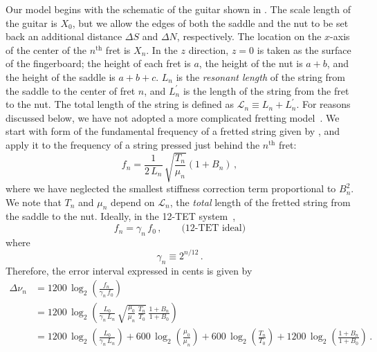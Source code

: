 Our model begins with the schematic of the guitar shown in . The scale length of the guitar is $X_0$, but we allow the edges of both the saddle and the nut to be set back an additional distance $\Delta S$ and $\Delta N$, respectively. The location on the $x$-axis of the center of the $n^\textrm{th}$ fret is $X_n$. In the $z$ direction, $z = 0$ is taken as the surface of the fingerboard; the height of each fret is $a$, the height of the nut is $a + b$, and the height of the saddle is $a + b + c$. $L_n$ is the \emph{resonant length} of the string from the saddle to the center of fret $n$, and $L^\prime_n$ is the length of the string from the fret to the nut. The total length of the string is defined as $\mathcal{L}_n \equiv L_n + L^\prime_n$. For reasons discussed below, we have not adopted a more complicated fretting model~\cite{ref:byers1996cgi,ref:varieschi2010icf}. We start with form of the fundamental frequency of a fretted string given by , and apply it to the frequency of a string pressed just behind the $n^\mathrm{th}$ fret:
 \begin{equation} \label{eqn:f_n_def}
f_n = \frac{1}{2\, L_n}\, \sqrt{\frac{T_n}{\mu_n}} \left( 1 + B_n \right)\, ,
 \end{equation}
where we have neglected the smallest stiffness correction term proportional to $B_n^2$. We note that $T_n$ and $\mu_n$ depend on $\mathcal{L}_n$, the \emph{total} length of the fretted string from the saddle to the nut. Ideally, in the 12-TET system~\cite{ref:durfee2015pms},
 \begin{equation} \label{eqn:f_n_tet}
f_n = \gamma_n\, f_0\, , \qquad \textrm{(12-TET~ideal)}
 \end{equation}
where
 \begin{equation} \label{eqn:gamme_n_def}
\gamma_n \equiv 2^{n / 12}\, .
 \end{equation}
Therefore, the error interval expressed in cents is given by
 \begin{equation}\label{eqn:error_def}
 \begin{split}
\Delta \nu_n &= 1200\, \log_2\left( \frac{f_n}{\gamma_n\, f_0} \right) \\
&= 1200\, \log_2 \left( \frac{L_0}{\gamma_n\, L_n}\, \sqrt{\frac{\mu_0}{\mu_n}\, \frac{T_n}{T_0}}\, \frac{1 + B_n}{1 + B_0} \right) \\
&= 1200\, \log_2 \left( \frac{L_0}{\gamma_n\, L_n} \right) + 600\, \log_2 \left(  \frac{\mu_0}{\mu_n} \right) + 600\, \log_2 \left( \frac{T_n}{T_0} \right) + 1200\, \log_2 \left( \frac{1 + B_n}{1 + B_0} \right)\, .
 \end{split}
 \end{equation}

